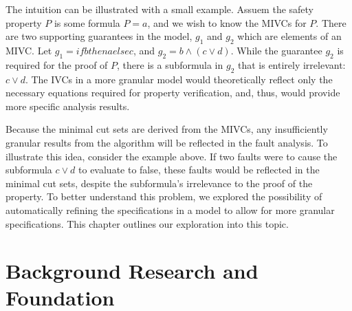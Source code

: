 The intuition can be illustrated with a small example. Assuem the safety property $P$ is some formula $P = a$, and we wish to know the MIVCs for $P$. There are two supporting guarantees in the model, $g_1$ and $g_2$ which are elements of an MIVC. Let $g_1 = \mathit{if} b \mathit{then} a \mathit{else} c$, and $g_2 = b \land (c \lor d)$. While the guarantee $g_2$ is required for the proof of $P$, there is a subformula in $g_2$ that is entirely irrelevant: $c \lor d$. The IVCs in a more granular model would theoretically reflect only the necessary equations required for property verification, and, thus, would provide more specific analysis results. 

Because the minimal cut sets are derived from the MIVCs, any insufficiently granular results from the \aivcalg algorithm will be reflected in the fault analysis. To illustrate this idea, consider the example above. If two faults were to cause the subformula $c \lor d$ to evaluate to false, these faults would be reflected in the minimal cut sets, despite the subformula's irrelevance to the proof of the property. To better understand this problem, we explored the possibility of automatically refining the specifications in a model to allow for more granular specifications. This chapter outlines our exploration into this topic. 

\section{Background Research and Foundation}


